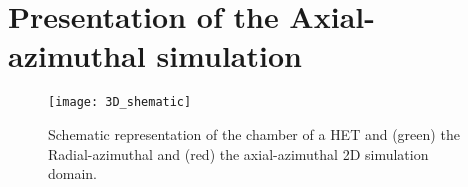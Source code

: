 
\section{Presentation of the Axial-azimuthal simulation}


\begin{figure}[hbtp]
  \centering
  \texttt{[image: 3D\_shematic]}
  \caption{Schematic representation of the chamber of a \ac{HET} and (green) the Radial-azimuthal and (red) the axial-azimuthal 2D simulation domain.}
  \label{fig-3Dschematic}
\end{figure}
